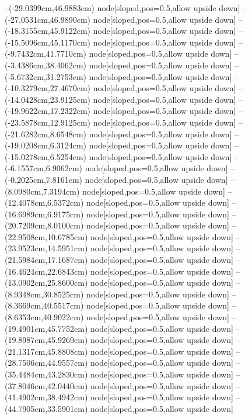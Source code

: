 --(-29.0399cm,46.9883cm) node[sloped,pos=0.5,allow upside down]{\ArrowIn}
--(-27.0531cm,46.9890cm) node[sloped,pos=0.5,allow upside down]{\ArrowIn}
--(-18.3155cm,45.9122cm) node[sloped,pos=0.5,allow upside down]{\ArrowIn}
--(-15.5096cm,45.1170cm) node[sloped,pos=0.5,allow upside down]{\ArrowIn}
--(-9.7432cm,41.7710cm) node[sloped,pos=0.5,allow upside down]{\ArrowIn}
--(-3.4386cm,38.4062cm) node[sloped,pos=0.5,allow upside down]{\ArrowIn}
--(-5.6732cm,31.2753cm) node[sloped,pos=0.5,allow upside down]{\ArrowIn}
--(-10.3279cm,27.4670cm) node[sloped,pos=0.5,allow upside down]{\ArrowIn}
--(-14.0428cm,23.9125cm) node[sloped,pos=0.5,allow upside down]{\ArrowIn}
--(-19.9622cm,17.2322cm) node[sloped,pos=0.5,allow upside down]{\ArrowIn}
--(-23.5878cm,12.9125cm) node[sloped,pos=0.5,allow upside down]{\ArrowIn}
--(-21.6282cm,8.6548cm) node[sloped,pos=0.5,allow upside down]{\ArrowIn}
--(-19.0208cm,6.3124cm) node[sloped,pos=0.5,allow upside down]{\ArrowIn}
--(-15.0278cm,6.5254cm) node[sloped,pos=0.5,allow upside down]{\ArrowIn}
--(-6.1557cm,6.9062cm) node[sloped,pos=0.5,allow upside down]{\ArrowIn}
--(-0.2025cm,7.8161cm) node[sloped,pos=0.5,allow upside down]{\ArrowIn}
--(8.0980cm,7.3194cm) node[sloped,pos=0.5,allow upside down]{\ArrowIn}
--(12.4078cm,6.5372cm) node[sloped,pos=0.5,allow upside down]{\ArrowIn}
--(16.6989cm,6.9175cm) node[sloped,pos=0.5,allow upside down]{\ArrowIn}
--(20.7209cm,8.0100cm) node[sloped,pos=0.5,allow upside down]{\ArrowIn}
--(22.9508cm,10.6785cm) node[sloped,pos=0.5,allow upside down]{\ArrowIn}
--(23.9523cm,14.5951cm) node[sloped,pos=0.5,allow upside down]{\ArrowIn}
--(21.5984cm,17.1687cm) node[sloped,pos=0.5,allow upside down]{\ArrowIn}
--(16.4624cm,22.6843cm) node[sloped,pos=0.5,allow upside down]{\ArrowIn}
--(13.0902cm,25.8600cm) node[sloped,pos=0.5,allow upside down]{\ArrowIn}
--(8.9348cm,30.8525cm) node[sloped,pos=0.5,allow upside down]{\ArrowIn}
--(8.3669cm,40.5517cm) node[sloped,pos=0.5,allow upside down]{\ArrowIn}
--(8.6353cm,40.9022cm) node[sloped,pos=0.5,allow upside down]{\arrowIn}
--(19.4901cm,45.7752cm) node[sloped,pos=0.5,allow upside down]{\ArrowIn}
--(19.8987cm,45.9269cm) node[sloped,pos=0.5,allow upside down]{\arrowIn}
--(21.1317cm,45.8808cm) node[sloped,pos=0.5,allow upside down]{\ArrowIn}
--(28.7506cm,44.9557cm) node[sloped,pos=0.5,allow upside down]{\ArrowIn}
--(35.4484cm,43.2830cm) node[sloped,pos=0.5,allow upside down]{\ArrowIn}
--(37.8046cm,42.0440cm) node[sloped,pos=0.5,allow upside down]{\ArrowIn}
--(41.4902cm,38.4942cm) node[sloped,pos=0.5,allow upside down]{\ArrowIn}
--(44.7905cm,33.5901cm) node[sloped,pos=0.5,allow upside down]{\ArrowIn}
